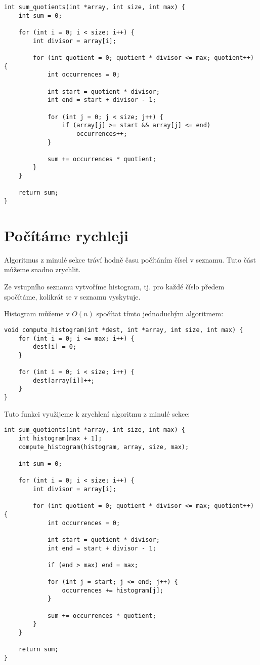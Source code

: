 \documentclass{article}
\begin{document}
\begin{verbatim}
int sum_quotients(int *array, int size, int max) {
    int sum = 0;

    for (int i = 0; i < size; i++) {
        int divisor = array[i];

        for (int quotient = 0; quotient * divisor <= max; quotient++) {
            int occurrences = 0;

            int start = quotient * divisor;
            int end = start + divisor - 1;
        
            for (int j = 0; j < size; j++) {
                if (array[j] >= start && array[j] <= end)
                    occurrences++;
            }

            sum += occurrences * quotient;
        }
    }

    return sum;
}
\end{verbatim}

\section{Počítáme rychleji}

Algoritmus z minulé sekce tráví hodně času počítáním čísel v seznamu. Tuto část můžeme snadno zrychlit.

Ze vstupního seznamu vytvoříme histogram, tj. pro každé číslo předem spočítáme, kolikrát se v seznamu vyskytuje.

Histogram můžeme v \(O\left(n\right)\) spočítat tímto jednoduchým algoritmem:

\begin{verbatim}
void compute_histogram(int *dest, int *array, int size, int max) {
    for (int i = 0; i <= max; i++) {
        dest[i] = 0;
    }

    for (int i = 0; i < size; i++) {
        dest[array[i]]++;
    }
}
\end{verbatim}

Tuto funkci využijeme k zrychlení algoritmu z minulé sekce:

\begin{verbatim}
int sum_quotients(int *array, int size, int max) {
    int histogram[max + 1];
    compute_histogram(histogram, array, size, max);
    
    int sum = 0;

    for (int i = 0; i < size; i++) {
        int divisor = array[i];

        for (int quotient = 0; quotient * divisor <= max; quotient++) {
            int occurrences = 0;

            int start = quotient * divisor;
            int end = start + divisor - 1;

            if (end > max) end = max;
        
            for (int j = start; j <= end; j++) {
                occurrences += histogram[j];
            }

            sum += occurrences * quotient;
        }
    }

    return sum;
}
\end{verbatim}
\end{document}
